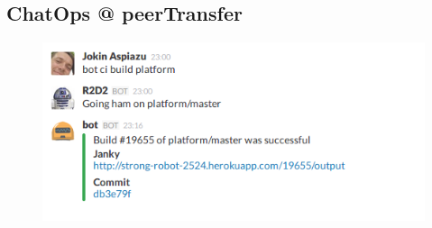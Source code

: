 \documentclass[
paper=128mm:96mm, %
fontsize=11pt, %
pagesize, %
parskip=half-, %
]{scrartcl} %
\theoremstyle{mythmstyle} %
\newtheorem{theorem}{Theorem}[section] %
\newcommand*{\mybox}[2]{ %
\par\noindent
\begin{tikzpicture}[mynodestyle/.style={rectangle,draw=mygreen,thick,inner sep=2mm,text justified,top color=white,bottom color=white,above}]\node[mynodestyle,at={(0.5*#1+2mm+0.4pt,0)}]{ %
\begin{minipage}[t]{#1}
#2
\end{minipage}
};
\end{tikzpicture}
\par\vspace{-1.3em}}
\begin{document}
\clearpage













\subsection{ChatOps @ peerTransfer}

\begin{figure}[h]
\centering\includegraphics[width=0.8\linewidth]{cibuild.png}
\end{figure}
\end{document}
